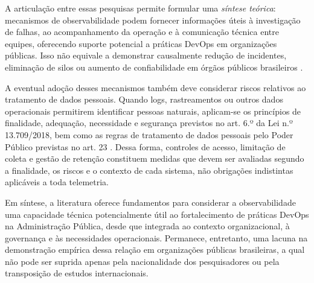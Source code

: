 A articulação entre essas pesquisas permite formular uma \emph{síntese teórica}: mecanismos de observabilidade podem fornecer informações úteis à investigação de falhas, ao acompanhamento da operação e à comunicação técnica entre equipes, oferecendo suporte potencial a práticas DevOps em organizações públicas. Isso não equivale a demonstrar causalmente redução de incidentes, eliminação de silos ou aumento de confiabilidade em órgãos públicos brasileiros \cite{plant2025,gomes2025,figueredo2026}.

A eventual adoção desses mecanismos também deve considerar riscos relativos ao tratamento de dados pessoais. Quando logs, rastreamentos ou outros dados operacionais permitirem identificar pessoas naturais, aplicam-se os princípios de finalidade, adequação, necessidade e segurança previstos no art. 6.º da Lei n.º 13.709/2018, bem como as regras de tratamento de dados pessoais pelo Poder Público previstas no art. 23 \cite{brasil2018}. Dessa forma, controles de acesso, limitação de coleta e gestão de retenção constituem medidas que devem ser avaliadas segundo a finalidade, os riscos e o contexto de cada sistema, não obrigações indistintas aplicáveis a toda telemetria.

Em síntese, a literatura oferece fundamentos para considerar a observabilidade uma capacidade técnica potencialmente útil ao fortalecimento de práticas DevOps na Administração Pública, desde que integrada ao contexto organizacional, à governança e às necessidades operacionais. Permanece, entretanto, uma lacuna na demonstração empírica dessa relação em organizações públicas brasileiras, a qual não pode ser suprida apenas pela nacionalidade dos pesquisadores ou pela transposição de estudos internacionais.
